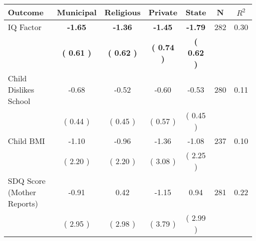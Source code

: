\begin{tabular}{lcccccc}
\toprule
 \textbf{Outcome} & \textbf{Municipal} & \textbf{Religious} & \textbf{Private} & \textbf{State} & \textbf{N} & \textbf{$ R^2$} \\
\midrule
IQ Factor & \textbf{    -1.65} & \textbf{    -1.36} & \textbf{    -1.45} & \textbf{    -1.79} & 282 &      0.30 \\ 
 & \textbf{(     0.61 )} & \textbf{(     0.62 )} & \textbf{(     0.74 )} & \textbf{(     0.62 )} & \\
Child Dislikes School &     -0.68 &     -0.52 &     -0.60 &     -0.53 & 280 &      0.11 \\ 
 & (     0.44 ) & (     0.45 ) & (     0.57 ) & (     0.45 ) & \\
Child BMI &     -1.10 &     -0.96 &     -1.36 &     -1.08 & 237 &      0.10 \\ 
 & (     2.20 ) & (     2.20 ) & (     3.08 ) & (     2.25 ) & \\
SDQ Score (Mother Reports) &     -0.91 &      0.42 &     -1.15 &      0.94 & 281 &      0.22 \\ 
 & (     2.95 ) & (     2.98 ) & (     3.79 ) & (     2.99 ) & \\
\bottomrule
\end{tabular}
